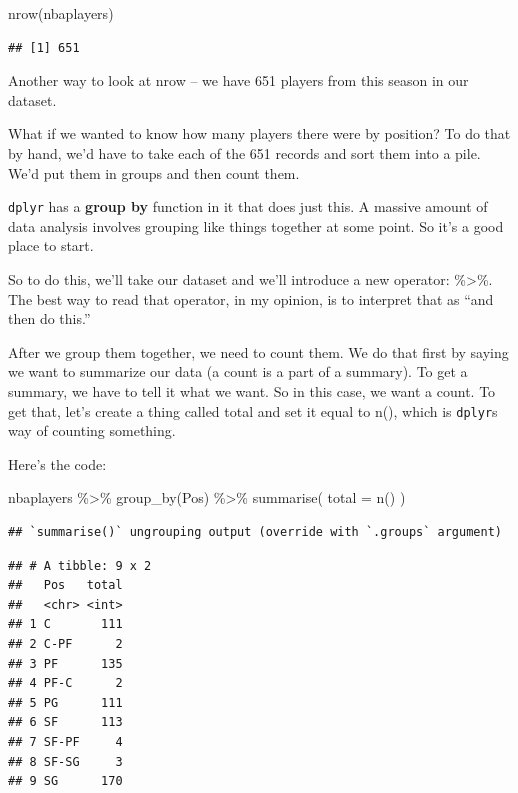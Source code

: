 \documentclass[
]{book}
\newenvironment{Shaded}{\begin{snugshade}}{\end{snugshade}}
\newcommand{\AttributeTok}[1]{\textcolor[rgb]{0.77,0.63,0.00}{#1}}
\newcommand{\FunctionTok}[1]{\textcolor[rgb]{0.00,0.00,0.00}{#1}}
\newcommand{\NormalTok}[1]{#1}
\newcommand{\SpecialCharTok}[1]{\textcolor[rgb]{0.00,0.00,0.00}{#1}}
\begin{document}
\begin{Shaded}
\begin{Highlighting}[]
\FunctionTok{nrow}\NormalTok{(nbaplayers)}
\end{Highlighting}
\end{Shaded}

\begin{verbatim}
## [1] 651
\end{verbatim}

Another way to look at nrow -- we have 651 players from this season in our dataset.

What if we wanted to know how many players there were by position? To do that by hand, we'd have to take each of the 651 records and sort them into a pile. We'd put them in groups and then count them.

\texttt{dplyr} has a \textbf{group by} function in it that does just this. A massive amount of data analysis involves grouping like things together at some point. So it's a good place to start.

So to do this, we'll take our dataset and we'll introduce a new operator: \%\textgreater\%. The best way to read that operator, in my opinion, is to interpret that as ``and then do this.''

After we group them together, we need to count them. We do that first by saying we want to summarize our data (a count is a part of a summary). To get a summary, we have to tell it what we want. So in this case, we want a count. To get that, let's create a thing called total and set it equal to n(), which is \texttt{dplyr}s way of counting something.

Here's the code:

\begin{Shaded}
\begin{Highlighting}[]
\NormalTok{nbaplayers }\SpecialCharTok{\%\textgreater{}\%}
  \FunctionTok{group\_by}\NormalTok{(Pos) }\SpecialCharTok{\%\textgreater{}\%}
  \FunctionTok{summarise}\NormalTok{(}
    \AttributeTok{total =} \FunctionTok{n}\NormalTok{()}
\NormalTok{  )}
\end{Highlighting}
\end{Shaded}

\begin{verbatim}
## `summarise()` ungrouping output (override with `.groups` argument)
\end{verbatim}

\begin{verbatim}
## # A tibble: 9 x 2
##   Pos   total
##   <chr> <int>
## 1 C       111
## 2 C-PF      2
## 3 PF      135
## 4 PF-C      2
## 5 PG      111
## 6 SF      113
## 7 SF-PF     4
## 8 SF-SG     3
## 9 SG      170
\end{verbatim}
\end{document}
